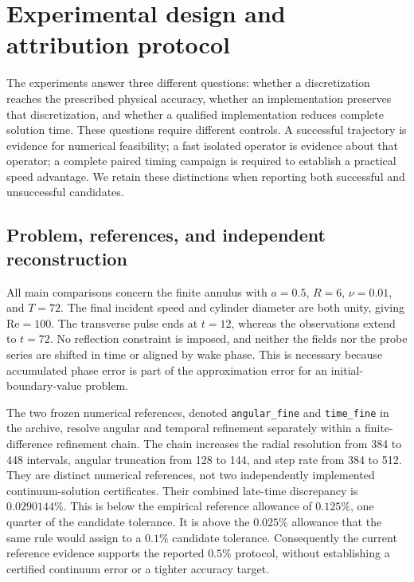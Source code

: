 \section{Experimental design and attribution protocol}
\label{sec:validation}

The experiments answer three different questions: whether a discretization reaches the prescribed physical accuracy, whether an implementation preserves that discretization, and whether a qualified implementation reduces complete solution time. These questions require different controls. A successful trajectory is evidence for numerical feasibility; a fast isolated operator is evidence about that operator; a complete paired timing campaign is required to establish a practical speed advantage. We retain these distinctions when reporting both successful and unsuccessful candidates.

\subsection{Problem, references, and independent reconstruction}

All main comparisons concern the finite annulus with $a=0.5$, $R=6$, $\nu=0.01$, and $T=72$. The final incident speed and cylinder diameter are both unity, giving $\mathrm{Re}=100$. The transverse pulse ends at $t=12$, whereas the observations extend to $t=72$. No reflection constraint is imposed, and neither the fields nor the probe series are shifted in time or aligned by wake phase. This is necessary because accumulated phase error is part of the approximation error for an initial-boundary-value problem.

The two frozen numerical references, denoted \texttt{angular\_fine} and \texttt{time\_fine} in the archive, resolve angular and temporal refinement separately within a finite-difference refinement chain. The chain increases the radial resolution from 384 to 448 intervals, angular truncation from 128 to 144, and step rate from 384 to 512. They are distinct numerical references, not two independently implemented continuum-solution certificates. Their combined late-time discrepancy is $0.0290144\%$. This is below the empirical reference allowance of $0.125\%$, one quarter of the candidate tolerance. It is above the $0.025\%$ allowance that the same rule would assign to a $0.1\%$ candidate tolerance. Consequently the current reference evidence supports the reported $0.5\%$ protocol, without establishing a certified continuum error or a tighter accuracy target.

